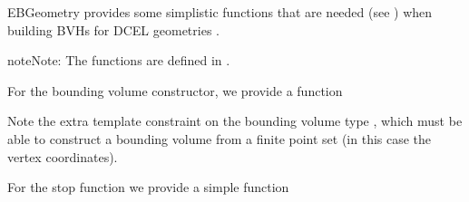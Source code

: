\documentclass[letterpaper,10pt,english]{sphinxmanual}
\begin{document}
\sphinxAtStartPar
EBGeometry provides some simplistic functions that are needed (see {\hyperref[\detokenize{ImplemBVH:chap-bvhconstruction}]{}}) when building BVHs for DCEL geometries .

\begin{sphinxadmonition}{note}{Note:}
\sphinxAtStartPar
The functions are defined in .
\end{sphinxadmonition}

\sphinxAtStartPar
For the bounding volume constructor, we provide a function

\begin{sphinxVerbatim}[commandchars=\\\{\}]
\PYG{p}{[}\PYG{p}{]}
\end{sphinxVerbatim}

\sphinxAtStartPar
Note the extra template constraint on the bounding volume type , which must be able to construct a bounding volume from a finite point set (in this case the vertex coordinates).

\sphinxAtStartPar
For the stop function we provide a simple function
\end{document}
